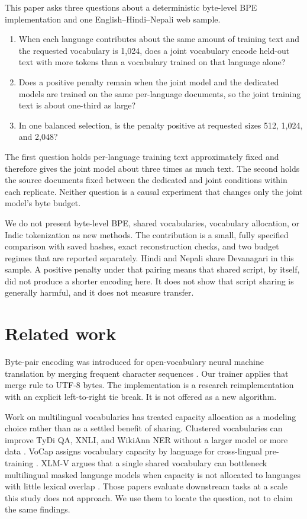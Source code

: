 \documentclass[10pt,twocolumn]{article}
\begin{document}
This paper asks three questions about a deterministic byte-level BPE implementation and one English--Hindi--Nepali web sample.
\begin{enumerate}
\item When each language contributes about the same amount of training text and the requested vocabulary is 1{,}024, does a joint vocabulary encode held-out text with more tokens than a vocabulary trained on that language alone?
\item Does a positive penalty remain when the joint model and the dedicated models are trained on the same per-language documents, so the joint training text is about one-third as large?
\item In one balanced selection, is the penalty positive at requested sizes 512, 1{,}024, and 2{,}048?
\end{enumerate}
The first question holds per-language training text approximately fixed and therefore gives the joint model about three times as much text.
The second holds the source documents fixed between the dedicated and joint conditions within each replicate.
Neither question is a causal experiment that changes only the joint model's byte budget.

We do not present byte-level BPE, shared vocabularies, vocabulary allocation, or Indic tokenization as new methods.
The contribution is a small, fully specified comparison with saved hashes, exact reconstruction checks, and two budget regimes that are reported separately.
Hindi and Nepali share Devanagari in this sample.
A positive penalty under that pairing means that shared script, by itself, did not produce a shorter encoding here.
It does not show that script sharing is generally harmful, and it does not measure transfer.

\section{Related work}

Byte-pair encoding was introduced for open-vocabulary neural machine translation by merging frequent character sequences \citep{sennrich-etal-2016-neural}.
Our trainer applies that merge rule to UTF-8 bytes.
The implementation is a research reimplementation with an explicit left-to-right tie break.
It is not offered as a new algorithm.

Work on multilingual vocabularies has treated capacity allocation as a modeling choice rather than as a settled benefit of sharing.
Clustered vocabularies can improve TyDi QA, XNLI, and WikiAnn NER without a larger model or more data \citep{chung-etal-2020-improving}.
VoCap assigns vocabulary capacity by language for cross-lingual pre-training \citep{zheng-etal-2021-allocating}.
XLM-V argues that a single shared vocabulary can bottleneck multilingual masked language models when capacity is not allocated to languages with little lexical overlap \citep{liang-etal-2023-xlm}.
Those papers evaluate downstream tasks at a scale this study does not approach.
We use them to locate the question, not to claim the same findings.
\end{document}
